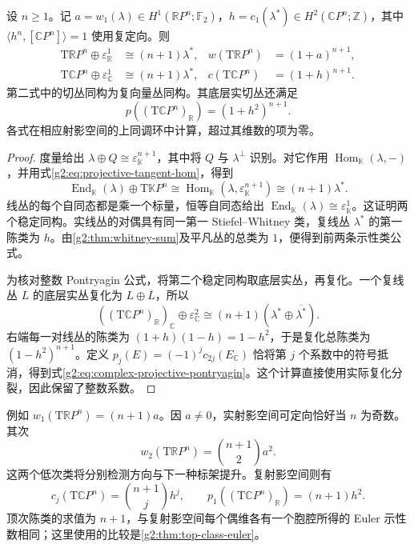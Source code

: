 \begin{proposition}\label{g2:prop:projective-tangent-characteristic}
	设 \(n\ge1\)。记 \(a=w_1(\lambda)\in H^1(\mathbb RP^n;\mathbb F_2)\)，\(h=c_1(\lambda^*)\in H^2(\mathbb CP^n;\mathbb Z)\)，其中 \(\langle h^n,[\mathbb CP^n]\rangle=1\) 使用复定向。则
	\begin{align}
		\mathrm T\mathbb RP^n\oplus\varepsilon_{\mathbb R}^1&\cong(n+1)\lambda^*,&
		w(\mathrm T\mathbb RP^n)&=(1+a)^{n+1},\label{g2:eq:real-projective-tangent-classes}\\
		\mathrm T\mathbb CP^n\oplus\varepsilon_{\mathbb C}^1&\cong(n+1)\lambda^*,&
		c(\mathrm T\mathbb CP^n)&=(1+h)^{n+1}.\label{g2:eq:complex-projective-tangent-classes}
	\end{align}
	第二式中的切丛同构为复向量丛同构。其底层实切丛还满足
	\begin{equation}\label{g2:eq:complex-projective-pontryagin}
		p((\mathrm T\mathbb CP^n)_{\mathbb R})=(1+h^2)^{n+1}.
	\end{equation}
	各式在相应射影空间的上同调环中计算，超过其维数的项为零。
\end{proposition}
\begin{proof}
	度量给出 \(\lambda\oplus Q\cong\varepsilon_{\mathbb K}^{n+1}\)，其中将 \(Q\) 与 \(\lambda^\perp\) 识别。对它作用 \(\operatorname{Hom}_{\mathbb K}(\lambda,-)\)，并用式\eqref{g2:eq:projective-tangent-hom}，得到
	\[
		\operatorname{End}_{\mathbb K}(\lambda)\oplus\mathrm T\mathbb KP^n
		\cong\operatorname{Hom}_{\mathbb K}(\lambda,\varepsilon_{\mathbb K}^{n+1})
		\cong(n+1)\lambda^*.
	\]
	线丛的每个自同态都是乘一个标量，恒等自同态给出 \(\operatorname{End}_{\mathbb K}(\lambda)\cong\varepsilon_{\mathbb K}^1\)。这证明两个稳定同构。实线丛的对偶具有同一第一 Stiefel--Whitney 类，复线丛 \(\lambda^*\) 的第一陈类为 \(h\)。由\cref{g2:thm:whitney-sum}及平凡丛的总类为 \(1\)，便得到前两条示性类公式。

	为核对整数 Pontryagin 公式，将第二个稳定同构取底层实丛，再复化。一个复线丛 \(L\) 的底层实丛复化为 \(L\oplus\overline L\)，所以
	\[
		((\mathrm T\mathbb CP^n)_{\mathbb R})_{\mathbb C}\oplus\varepsilon_{\mathbb C}^2
		\cong(n+1)(\lambda^*\oplus\overline{\lambda^*}).
	\]
	右端每一对线丛的陈类为 \((1+h)(1-h)=1-h^2\)，于是复化总陈类为 \((1-h^2)^{n+1}\)。定义 \(p_j(E)=(-1)^jc_{2j}(E_{\mathbb C})\) 恰将第 \(j\) 个系数中的符号抵消，得到式\eqref{g2:eq:complex-projective-pontryagin}。这个计算直接使用实际复化分裂，因此保留了整数系数。
\end{proof}

例如 \(w_1(\mathrm T\mathbb RP^n)=(n+1)a\)。因 \(a\ne0\)，实射影空间可定向恰好当 \(n\) 为奇数。其次
\[
	w_2(\mathrm T\mathbb RP^n)=\binom{n+1}{2}a^2.
\]
这两个低次类将分别检测方向与下一种标架提升。复射影空间则有
\[
	c_j(\mathrm T\mathbb CP^n)=\binom{n+1}{j}h^j,\qquad
	p_1((\mathrm T\mathbb CP^n)_{\mathbb R})=(n+1)h^2.
\]
顶次陈类的求值为 \(n+1\)，与复射影空间每个偶维各有一个胞腔所得的 Euler 示性数相同；这里使用的比较是\cref{g2:thm:top-class-euler}。

